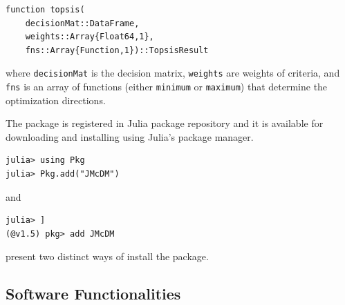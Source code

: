 \documentclass[preprint,review, 12pt, a4paper]{elsarticle}
\begin{document}
\begin{verbatim}
function topsis(
    decisionMat::DataFrame, 
    weights::Array{Float64,1}, 
    fns::Array{Function,1})::TopsisResult
\end{verbatim} 

\noindent where \texttt{decisionMat} is the decision matrix, \texttt{weights} are weights of criteria, and \texttt{fns} is an array of functions (either \texttt{minimum} or \texttt{maximum}) that determine the optimization directions. 

The package is registered in Julia package repository and it is available for downloading and installing using Julia's package manager.  

\begin{verbatim}
julia> using Pkg
julia> Pkg.add("JMcDM")
\end{verbatim}

\noindent and 

\begin{verbatim}
julia> ]
(@v1.5) pkg> add JMcDM
\end{verbatim}

\noindent present two distinct ways of install the package.


\subsection{Software Functionalities}
\label{section:softwareFunc}
\end{document}
